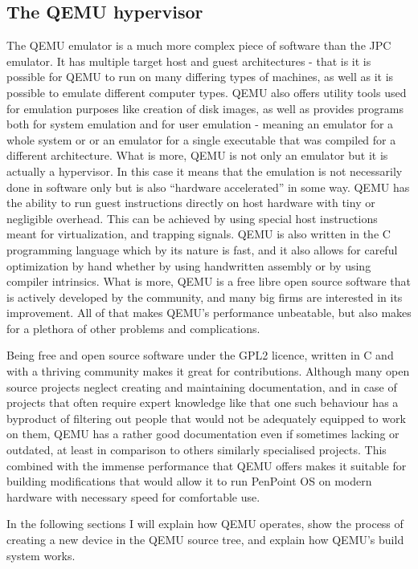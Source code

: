 \subsection{The QEMU hypervisor}

The QEMU emulator is a much more complex piece of software than the JPC
emulator. It has multiple target host and guest architectures - that is it is
possible for QEMU to run on many differing types of machines, as well as it is
possible to emulate different computer types. QEMU also offers utility tools
used for emulation purposes like creation of disk images, as well as provides
programs both for system emulation and for user emulation - meaning an emulator
for a whole system or or an emulator for a single executable that was compiled
for a different architecture. What is more, QEMU is not only an emulator but it
is actually a hypervisor. In this case it means that the emulation is not
necessarily done in software only but is also ``hardware accelerated'' in some
way. QEMU has the ability to run guest instructions directly on host hardware
with tiny or negligible overhead.  This can be achieved by using special host
instructions meant for virtualization, and trapping signals. QEMU is also
written in the C programming language which by its nature is fast, and it also
allows for careful optimization by hand whether by using handwritten assembly or
by using compiler intrinsics. What is more, QEMU is a free libre open source
software that is actively developed by the community, and many big firms are
interested in its improvement. All of that makes QEMU's performance unbeatable,
but also makes for a plethora of other problems and complications.

Being free and open source software under the GPL2 licence, written in C and
with a thriving community makes it great for contributions. Although many open
source projects neglect creating and maintaining documentation, and in case of
projects that often require expert knowledge like that one such behaviour has
a byproduct of filtering out people that would not be adequately equipped to
work on them, QEMU has a rather good documentation even if sometimes lacking or
outdated, at least in comparison to others similarly specialised projects. This
combined with the immense performance that QEMU offers makes it suitable for
building modifications that would allow it to run PenPoint OS on modern
hardware with necessary speed for comfortable use.

In the following sections I will explain how QEMU operates, show the process of
creating a new device in the QEMU source tree, and explain how QEMU's build
system works.

